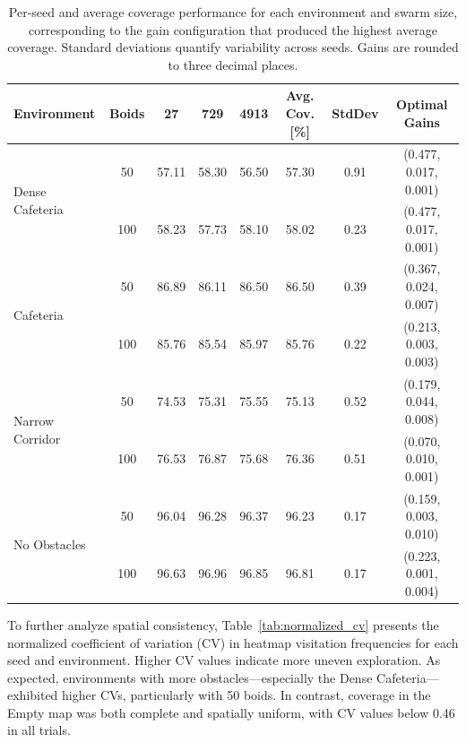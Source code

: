 \documentclass[12pt]{article}
\begin{document}
\begin{table}[H]
    \footnotesize
    \centering
    \begin{tabular}{|l|c|c|c|c|c|c|c|}
    \hline
    \textbf{Environment} & \textbf{Boids} & \textbf{27} & \textbf{729} & \textbf{4913} & \textbf{Avg. Cov. [\%]} & \textbf{StdDev} & \textbf{Optimal Gains} \\
    \hline
    \multirow{2}{*}{Dense Cafeteria} 
        & 50  & 57.11 & 58.30 & 56.50 & 57.30 & 0.91 & (0.477, 0.017, 0.001) \\
        & 100 & 58.23 & 57.73 & 58.10 & 58.02 & 0.23 & (0.477, 0.017, 0.001) \\
    \hline
    \multirow{2}{*}{Cafeteria} 
        & 50  & 86.89 & 86.11 & 86.50 & 86.50 & 0.39 & (0.367, 0.024, 0.007) \\
        & 100 & 85.76 & 85.54 & 85.97 & 85.76 & 0.22 & (0.213, 0.003, 0.003) \\
    \hline
    \multirow{2}{*}{Narrow Corridor} 
        & 50  & 74.53 & 75.31 & 75.55 & 75.13 & 0.52 & (0.179, 0.044, 0.008) \\
        & 100 & 76.53 & 76.87 & 75.68 & 76.36 & 0.51 & (0.070, 0.010, 0.001) \\
    \hline
    \multirow{2}{*}{No Obstacles} 
        & 50  & 96.04 & 96.28 & 96.37 & 96.23 & 0.17 & (0.159, 0.003, 0.010) \\
        & 100 & 96.63 & 96.96 & 96.85 & 96.81 & 0.17 & (0.223, 0.001, 0.004) \\
    \hline
    \end{tabular}
    \caption{Per-seed and average coverage performance for each environment and swarm size, corresponding to the gain configuration that produced the highest average coverage. Standard deviations quantify variability across seeds. Gains are rounded to three decimal places.}
    \label{tab:coverage_by_seed_and_optimal_gain}
\end{table}

To further analyze spatial consistency, Table~\ref{tab:normalized_cv} presents the normalized coefficient of variation (CV) in heatmap visitation frequencies for each seed and environment. Higher CV values indicate more uneven exploration. As expected, environments with more obstacles—especially the Dense Cafeteria—exhibited higher CVs, particularly with 50 boids. In contrast, coverage in the Empty map was both complete and spatially uniform, with CV values below 0.46 in all trials.
\end{document}
